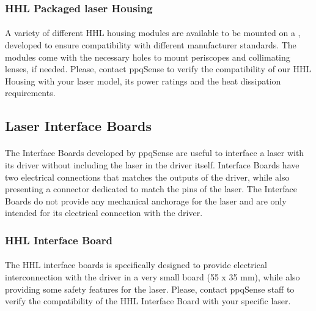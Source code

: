 
\subsubsection{HHL Packaged laser Housing}
\paragraph{} A variety of different HHL housing modules are available to be mounted on a \QubeModel , developed to ensure compatibility with different manufacturer standards. The modules come with the necessary holes to mount periscopes and collimating lenses, if needed.
\newline Please, contact ppqSense to verify the compatibility of our HHL Housing with your laser model, its power ratings and the heat dissipation requirements.





\subsection{Laser Interface Boards} \label{cpt:interface_boards}
\paragraph{} The Interface Boards developed by ppqSense are useful to interface a laser with its \QubeModel  driver without including the laser in the driver itself. Interface Boards have two electrical connections that matches the outputs of the \QubeModel  driver, while also presenting a connector dedicated to match the pins of the laser.
\newline The Interface Boards do not provide any mechanical anchorage for the laser and are only intended for its electrical connection with the \QubeModel  driver.





\subsubsection{HHL Interface Board}
\paragraph{} The HHL interface boards is specifically designed to provide electrical interconnection with the \QubeModel  driver in a very small board (55 x 35 mm), while also providing some safety features for the laser.
\newline Please, contact ppqSense staff to verify the compatibility of the HHL Interface Board with your specific laser.




